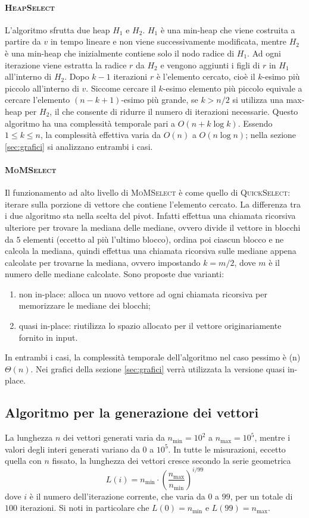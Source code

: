 \documentclass[a4paper,12pt]{article}
\newcommand{\QuickSelect}{\textsc{QuickSelect}}
\newcommand{\HeapSelect}{\textsc{HeapSelect}}
\newcommand{\MoMSelect}{\textsc{MoMSelect}}
\newcommand{\Tlin}{\ifmmode \Theta(n) \else $\Theta(n)$\fi} %
\begin{document}
\paragraph{\HeapSelect}
L'algoritmo sfrutta due heap $H_1$ e $H_2$.
$H_1$ è una min-heap che viene costruita a partire da $v$ in tempo lineare e non viene successivamente modificata, mentre $H_2$ è una min-heap che inizialmente contiene solo il nodo radice di $H_1$.
Ad ogni iterazione viene estratta la radice $r$ da $H_2$ e vengono aggiunti i figli di $r$ in $H_1$ all'interno di $H_2$.
Dopo $k-1$ iterazioni $r$ è l'elemento cercato, cioè il $k$-esimo più piccolo all'interno di $v$.
Siccome cercare il $k$-esimo elemento più piccolo equivale a cercare l'elemento $(n-k+1)$-esimo più grande, se $k>n/2$ si utilizza una max-heap per $H_2$, il che consente di ridurre il numero di iterazioni necessarie.
Questo algoritmo ha una complessità temporale pari a $O(n+k\log k)$.
Essendo $1 \le k \le n$, la complessità effettiva varia da $O(n)$ a $O(n\log n)$; nella sezione \ref{sec:grafici} si analizzano entrambi i casi.

\paragraph{\MoMSelect}
Il funzionamento ad alto livello di \MoMSelect{} è come quello di \QuickSelect: iterare sulla porzione di vettore che contiene l'elemento cercato.
La differenza tra i due algoritmo sta nella scelta del pivot.
Infatti \MomSelect{} effettua una chiamata ricorsiva ulteriore per trovare la mediana delle mediane, ovvero divide il vettore in blocchi da $5$ elementi (eccetto al più l'ultimo blocco), ordina poi ciascun blocco e ne calcola la mediana, quindi effettua una chiamata ricorsiva sulle mediane appena calcolate per trovarne la mediana, ovvero impostando $k=m/2$, dove $m$ è il numero delle mediane calcolate.
Sono proposte due varianti:
\begin{enumerate}
    \item non in-place: alloca un nuovo vettore ad ogni chiamata ricorsiva per memorizzare le mediane dei blocchi;
    \item quasi in-place: riutilizza lo spazio allocato per il vettore originariamente fornito in input.
\end{enumerate}
In entrambi i casi, la complessità temporale dell'algoritmo nel caso pessimo è \Tlin{}.
Nei grafici della sezione \ref{sec:grafici} verrà utilizzata la versione quasi in-place.


\subsection{Algoritmo per la generazione dei vettori}
La lunghezza $n$ dei vettori generati varia da $n_{\min}=10^2$ a $n_{\max}=10^5$, mentre i valori degli interi generati variano da $0$ a $10^5$.
In tutte le misurazioni, eccetto quella con $n$ fissato, la lunghezza dei vettori cresce secondo la serie geometrica
\[
    L(i) = n_{\min} \cdot \left(\frac{n_{\max}}{n_{\min}}\right)^{i/99}
\]
dove $i$ è il numero dell'iterazione corrente, che varia da $0$ a $99$, per un totale di $100$ iterazioni.
Si noti in particolare che $L(0) = n_{\min}$ e $L(99) = n_{\max}$.
\end{document}
